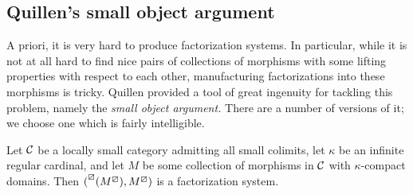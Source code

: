 \subsection{Quillen's small object argument}
A priori, it is very hard to produce factorization systems. In particular, while it is not at all hard to find nice pairs of collections of morphisms with some
lifting properties with respect to each other, manufacturing factorizations into these morphisms is tricky. Quillen provided a tool of great ingenuity for tackling this problem,
namely the \emph{small object argument.} There are a number of versions of it; we choose one which is fairly intelligible.

\begin{proposition}\label{prop:small-object-argument}
	Let \(\mathcal{C}\) be a locally small category admitting all small colimits, let \(\kappa\) be an infinite regular cardinal, and let \(M\) be some collection of morphisms
	in \(\mathcal{C}\) with \(\kappa\)-compact domains. Then \((\prescript{\boxslash}{}{(M^\boxslash)}, M^\boxslash)\) is a factorization system.
\end{proposition}

